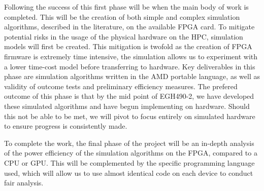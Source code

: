 \documentclass[11pt, a4paper]{article}
\begin{document}
	Following the success of this first phase will be when the main body of work is completed. This will be the creation of both simple and complex simulation algorithms, described in the literature, on the available FPGA card. To mitigate potential risks in the usage of the physical hardware on the HPC, simulation models will first be created. This mitigation is twofold as the creation of FPGA firmware is extremely time intensive, the simulation allows us to experiment with a lower time-cost model before transferring to hardware. Key deliverables in this phase are simulation algorithms written in the AMD portable language, as well as validity of outcome tests and preliminary efficiency measures. The prefered outcome of this phase is that by the mid point of EGH490-2, we have developed these simulated algorithms and have begun implementing on hardware. Should this not be able to be met, we will pivot to focus entirely on simulated hardware to ensure progress is consistently made.
	
	To complete the work, the final phase of the project will be an in-depth analysis of the power efficiency of the simulation algorithms on the FPGA, compared to a CPU or GPU. This will be complemented by the specific programming language used, which will allow us to use almost identical code on each device to conduct fair analysis. 
			
\end{document}
